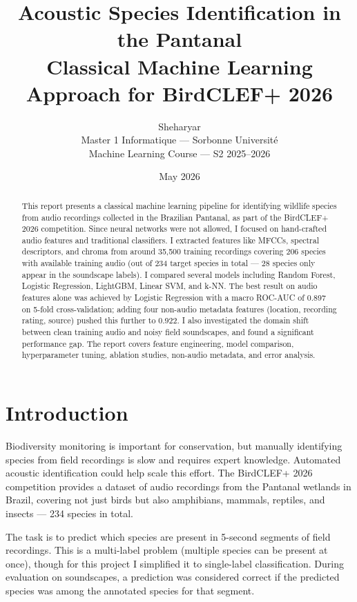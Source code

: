\documentclass[11pt,a4paper]{article}
\title{Acoustic Species Identification in the Pantanal\\
\large Classical Machine Learning Approach for BirdCLEF+ 2026}
\author{Sheharyar\\
Master 1 Informatique — Sorbonne Université\\
Machine Learning Course — S2 2025--2026}
\date{May 2026}
\begin{document}
\maketitle

\begin{abstract}
This report presents a classical machine learning pipeline for identifying wildlife species from audio recordings collected in the Brazilian Pantanal, as part of the BirdCLEF+ 2026 competition. Since neural networks were not allowed, I focused on hand-crafted audio features and traditional classifiers. I extracted features like MFCCs, spectral descriptors, and chroma from around 35,500 training recordings covering 206 species with available training audio (out of 234 target species in total — 28 species only appear in the soundscape labels). I compared several models including Random Forest, Logistic Regression, LightGBM, Linear SVM, and k-NN. The best result on audio features alone was achieved by Logistic Regression with a macro ROC-AUC of 0.897 on 5-fold cross-validation; adding four non-audio metadata features (location, recording rating, source) pushed this further to 0.922. I also investigated the domain shift between clean training audio and noisy field soundscapes, and found a significant performance gap. The report covers feature engineering, model comparison, hyperparameter tuning, ablation studies, non-audio metadata, and error analysis.
\end{abstract}

\section{Introduction}

Biodiversity monitoring is important for conservation, but manually identifying species from field recordings is slow and requires expert knowledge. Automated acoustic identification could help scale this effort. The BirdCLEF+ 2026 competition provides a dataset of audio recordings from the Pantanal wetlands in Brazil, covering not just birds but also amphibians, mammals, reptiles, and insects — 234 species in total.

The task is to predict which species are present in 5-second segments of field recordings. This is a multi-label problem (multiple species can be present at once), though for this project I simplified it to single-label classification. During evaluation on soundscapes, a prediction was considered correct if the predicted species was among the annotated species for that segment.
\end{document}
